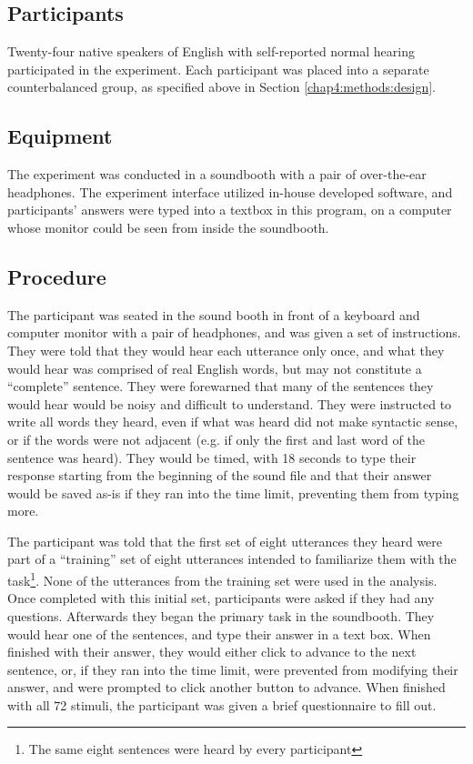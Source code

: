 \documentclass[dissertation,copyright]{uathesis}
\begin{document}
\subsection{Participants}

Twenty-four native speakers of English with self-reported normal hearing participated in the experiment. Each participant was placed into a separate counterbalanced group, as specified above in Section \ref{chap4:methods:design}.

\subsection{Equipment}

The experiment was conducted in a soundbooth with a pair of over-the-ear headphones.  The experiment interface utilized in-house developed software, and participants' answers were typed into a textbox in this program, on a computer whose monitor could be seen from inside the soundbooth.

\subsection{Procedure}
\label{hsp-main-procedure}

The participant was seated in the sound booth in front of a keyboard and computer monitor with a pair of headphones, and was given a set of instructions. They were told that they would hear each utterance only once, and what they would hear was comprised of real English words, but may not constitute a ``complete'' sentence.  They were forewarned that many of the sentences they would hear would be noisy and difficult to understand. They were instructed to write all words they heard, even if what was heard did not make syntactic sense, or if the words were not adjacent (e.g. if only the first and last word of the sentence was heard). They would be timed, with 18 seconds to type their response starting from the beginning of the sound file and that their answer would be saved as-is if they ran into the time limit, preventing them from typing more.

The participant was told that the first set of eight utterances they heard were part of a ``training'' set of eight utterances intended to familiarize them with the task\footnote{The same eight sentences were heard by every participant}.  None of the utterances from the training set were used in the analysis.  Once completed with this initial set, participants were asked if they had any questions.  Afterwards they began the primary task in the soundbooth.  They would hear one of the sentences, and type their answer in a text box.  When finished with their answer, they would either click to advance to the next sentence, or, if they ran into the time limit, were prevented from modifying their answer, and were prompted to click another button to advance.  When finished with all 72 stimuli, the participant was given a brief questionnaire to fill out.  
\end{document}
